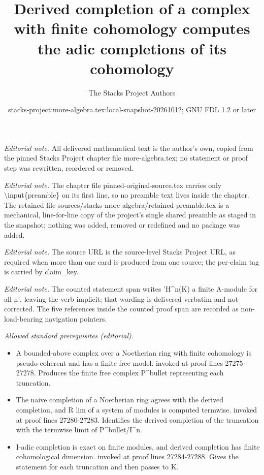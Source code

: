\documentclass[10pt,a4paper]{amsart}
\title{Derived completion of a complex with finite cohomology computes the adic completions of its cohomology}
\author{The Stacks Project Authors}
\date{stacks-project:more-algebra.tex:local-snapshot-20261012; GNU FDL 1.2 or later}
\theoremstyle{plain}
\theoremstyle{definition}
\theoremstyle{remark}
\numberwithin{equation}{subsection}
\begin{document}
\maketitle
\setcounter{subsection}{1}
\noindent\textit{Editorial note.} All delivered mathematical text is the author's own, copied from the pinned Stacks Project chapter file more-algebra.tex; no statement or proof step was rewritten, reordered or removed.\par\medskip
\noindent\textit{Editorial note.} The chapter file pinned-original-source.tex carries only \textbackslash{}input\{preamble\} on its first line, so no preamble text lives inside the chapter. The retained file sources/stacks-more-algebra/retained-preamble.tex is a mechanical, line-for-line copy of the project's single shared preamble as staged in the snapshot; nothing was added, removed or redefined and no package was added.\par\medskip
\noindent\textit{Editorial note.} The source URL is the source-level Stacks Project URL, as required when more than one card is produced from one source; the per-claim tag is carried by claim\_key.\par\medskip
\noindent\textit{Editorial note.} The counted statement span writes 'H\textasciicircum{}n(K) a finite A-module for all n', leaving the verb implicit; that wording is delivered verbatim and not corrected. The five references inside the counted proof span are recorded as non-load-bearing navigation pointers.\par\medskip
\noindent\textit{Allowed standard prerequisites (editorial).}\begin{itemize}
\item A bounded-above complex over a Noetherian ring with finite cohomology is pseudo-coherent and has a finite free model. invoked at proof lines 27275-27278. Produces the finite free complex P\textasciicircum{}bullet representing each truncation.
\item The naive completion of a Noetherian ring agrees with the derived completion, and R lim of a system of modules is computed termwise. invoked at proof lines 27280-27283. Identifies the derived completion of the truncation with the termwise limit of P\textasciicircum{}bullet/I\textasciicircum{}n.
\item I-adic completion is exact on finite modules, and derived completion has finite cohomological dimension. invoked at proof lines 27284-27288. Gives the statement for each truncation and then passes to K.
\end{itemize}\medskip
\end{document}
